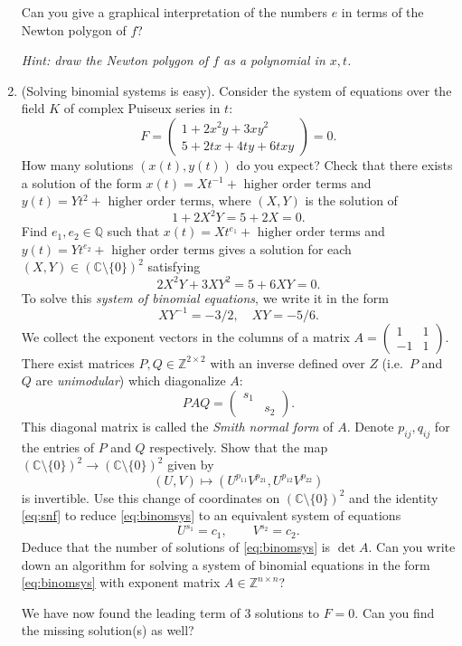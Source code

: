 \documentclass[11pt,reqno]{amsart}
\theoremstyle{definition}
\theoremstyle{remark}
\numberwithin{equation}{section}
\begin{document}
\begin{enumerate}
Can you give a graphical interpretation of the numbers $e$ in terms of the Newton polygon of $f$? 

\textit{Hint: draw the Newton polygon of $f$ as a polynomial in $x,t$. }


\item (Solving binomial systems is easy).
Consider the system of equations over the field $K$ of complex Puiseux series in $t$:
$$
F = \begin{pmatrix} 1 + 2 x^2 y + 3 xy^2  \\
5 + 2 tx  + 4 ty + 6 txy \end{pmatrix} = 0.
$$
How many solutions $(x(t),y(t))$ do you expect? Check that there exists a solution of the form $x(t) = X t^{-1} + \text{ higher order terms}$ and $y(t) = Y t^2 + \text{ higher order terms}$, where $(X,Y)$ is the solution of
$$ 1 + 2 X^2Y = 5 + 2X = 0 .$$
Find $e_1, e_2 \in \mathbb{Q}$ such that $x(t) = X t^{e_1} +  \text{ higher order terms}$ and $y(t) = Y t^{e_2} + \text{ higher order terms}$ gives a solution for each $(X,Y) \in (\mathbb{C} \setminus \{0\})^2$ satisfying
$$ 2 X^2 Y + 3 XY^2 = 5 + 6 XY = 0.$$
To solve this \emph{system of binomial equations}, we write it in the form
\begin{equation} \label{eq:binomsys}
XY^{-1} = -3/2, \quad XY = -5/6.
\end{equation}
We collect the exponent vectors in the columns of a matrix $A = \begin{pmatrix}
1 & 1 \\ -1 & 1
\end{pmatrix}$. There exist matrices $P, Q \in \mathbb{Z}^{2 \times 2}$ with an inverse defined over $Z$ (i.e.~$P$ and $Q$ are \emph{unimodular}) which diagonalize $A$:
\begin{equation} \label{eq:snf}
P A Q = \begin{pmatrix}
s_1 & \\
& s_2
\end{pmatrix}.
\end{equation}
This diagonal matrix is called the \emph{Smith normal form} of $A$. Denote $p_{ij}, q_{ij}$ for the entries of $P$ and $Q$ respectively. Show that the map $ (\mathbb{C} \setminus \{0\})^2 \rightarrow (\mathbb{C} \setminus \{0\})^2 $ given by
$$ (U,V) \mapsto (U^{p_{11}} V^{p_{21}}, U^{p_{12}} V^{p_{22}})$$
is invertible. Use this change of coordinates on $(\mathbb{C} \setminus \{0\})^2$ and the identity \eqref{eq:snf} to reduce \eqref{eq:binomsys} to an equivalent system of equations
$$ U^{s_1} = c_1, \qquad V^{s_2} = c_2.$$
Deduce that the number of solutions of \eqref{eq:binomsys} is $\det A$. Can you write down an algorithm for solving a system of binomial equations in the form \eqref{eq:binomsys} with exponent matrix $A \in \mathbb{Z}^{n \times n}$?

We have now found the leading term of 3 solutions to $F = 0$. Can you find the missing solution(s) as well?
\end{enumerate}
\end{document}
